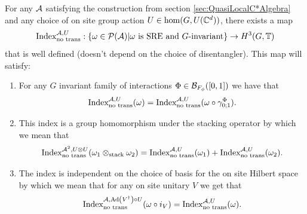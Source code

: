 \documentclass[12pt,a4paper,twoside]{article}
\numberwithin{equation}{section}
\begin{document}
\begin{theorem}\label{thrm:ExistenceOriginalIndex}
	For any $\AA$ satisfying the construction from section \ref{sec:QuasiLocalC*Algebra} and any choice of on site group action $U\in\hom(G,U(\CC^d))$, there exists a map
	\begin{equation}
		\textrm{Index}^{\AA,U}_{\text{no trans}}:\{\omega\in\PP(\AA)| \omega\text{ is SRE and }G\text{-invariant}\}\rightarrow H^3(G,\TT)
	\end{equation}
	that is well defined (doesn't depend on the choice of disentangler). This map will satisfy:
	\begin{enumerate}
		\item For any $G$ invariant family of interactions $\Phi\in\BB_{F_\phi}([0,1])$ we have that
		\begin{equation}
			\textrm{Index}^{\AA,U}_{\text{no trans}}(\omega)=\textrm{Index}^{\AA,U}_{\text{no trans}}(\omega\circ\gamma^\Phi_{0;1}).
		\end{equation}
		\item This index is a group homomorphism under the stacking operator by which we mean that
		\begin{equation}
			\textrm{Index}_{\text{no trans}}^{\AA^2,U\otimes U}(\omega_1\otimes_{\text{stack}}\omega_2)=\textrm{Index}_{\text{no trans}}^{\AA,U}(\omega_1)+\textrm{Index}_{\text{no trans}}^{\AA,U}(\omega_2).
		\end{equation}
		\item The index is independent on the choice of basis for the on site Hilbert space by which we mean that for any on site unitary $V$ we get that
		\begin{equation}
			\textrm{Index}^{\AA,\Ad{V^\dagger}\circ U}_{\text{no trans}}(\omega\circ i_V) =\textrm{Index}^{\AA,U}_{\text{no trans}}(\omega).
		\end{equation}
	\end{enumerate}
\end{theorem}
\end{document}
